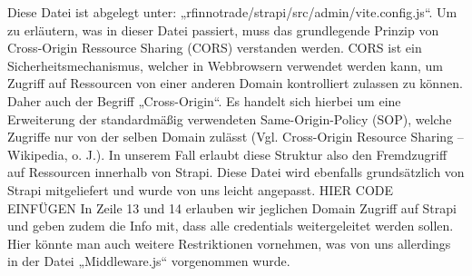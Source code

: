 Diese Datei ist abgelegt unter: „rfinnotrade/strapi/src/admin/vite.config.js“.
Um zu erläutern, was in dieser Datei passiert, muss das grundlegende Prinzip von Cross-Origin Ressource Sharing (CORS) verstanden werden. CORS ist ein Sicherheitsmechanismus, welcher in Webbrowsern verwendet werden kann, um Zugriff auf Ressourcen von einer anderen Domain kontrolliert zulassen zu können. Daher auch der Begriff „Cross-Origin“. Es handelt sich hierbei um eine Erweiterung der standardmäßig verwendeten Same-Origin-Policy (SOP), welche Zugriffe nur von der selben Domain zulässt (Vgl. Cross-Origin Resource Sharing – Wikipedia, o. J.). In unserem Fall erlaubt diese Struktur also den Fremdzugriff auf Ressourcen innerhalb von Strapi.
Diese Datei wird ebenfalls grundsätzlich von Strapi mitgeliefert und wurde von uns leicht angepasst. 
HIER CODE EINFÜGEN
In Zeile 13 und 14 erlauben wir jeglichen Domain Zugriff auf Strapi und geben zudem die Info mit, dass alle credentials weitergeleitet werden sollen. Hier könnte man auch weitere Restriktionen vornehmen, was von uns allerdings in der Datei „Middleware.js“ vorgenommen wurde.